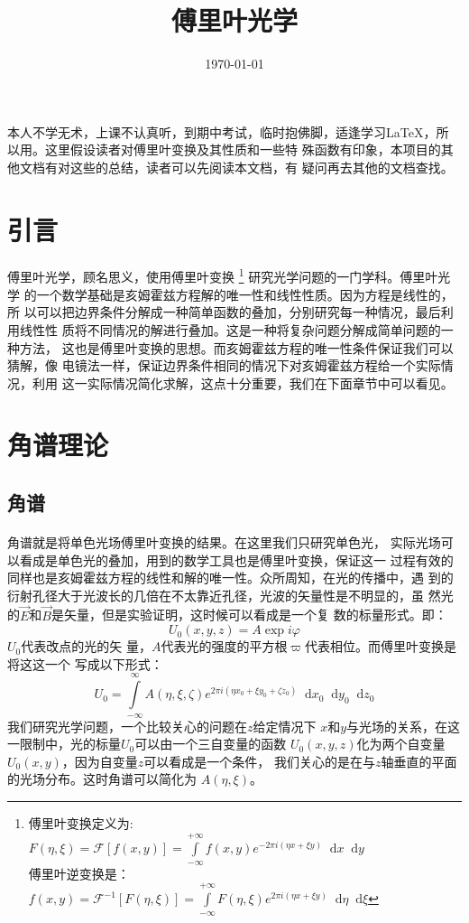 \documentclass{article}
\title{傅里叶光学}
\date{\today}
\newcommand*{\dif}{\mathop{}\!\mathrm{d}}
\begin{document}
\maketitle
\tableofcontents
本人不学无术，上课不认真听，到期中考试，临时抱佛脚，适逢学习\LaTeX，所
以用。这里假设读者对傅里叶变换及其性质和一些特
殊函数有印象，本项目的其他文档有对这些的总结，读者可以先阅读本文档，有
疑问再去其他的文档查找。
\section{引言}
\paragraph{}
傅里叶光学，顾名思义，使用傅里叶变换
\footnote{
  傅里叶变换定义为:$F(\eta,\xi)=\mathscr{F}[f(x,y)]=\int\limits_{-\infty}^{+\infty}f(x,y)e^{-2\pi i(\eta x+\xi y)}\dif x\dif y$\\
  傅里叶逆变换是：
  $f(x,y)=\mathscr{F}^{-1}[F(\eta,\xi)]=\int\limits_{-\infty}^{+\infty}F(\eta,\xi)e^{2\pi
    i(\eta x+\xi y)}\dif \eta\dif\xi$
}
研究光学问题的一门学科。傅里叶光学
的一个数学基础是亥姆霍兹方程解的唯一性和线性性质。因为方程是线性的，所
以可以把边界条件分解成一种简单函数的叠加，分别研究每一种情况，最后利用线性性
质将不同情况的解进行叠加。这是一种将复杂问题分解成简单问题的一种方法，
这也是傅里叶变换的思想。而亥姆霍兹方程的唯一性条件保证我们可以猜解，像
电镜法一样，保证边界条件相同的情况下对亥姆霍兹方程给一个实际情况，利用
这一实际情况简化求解，这点十分重要，我们在下面章节中可以看见。
\section{角谱理论}
\subsection{角谱}
\paragraph{}
角谱就是将单色光场傅里叶变换的结果。在这里我们只研究单色光，
实际光场可以看成是单色光的叠加，用到的数学工具也是傅里叶变换，保证这一
过程有效的同样也是亥姆霍兹方程的线性和解的唯一性。众所周知，在光的传播中，遇
到的衍射孔径大于光波长的几倍在不太靠近孔径，光波的矢量性是不明显的，虽
然光的$\vec{E}$和$\vec{B}$是矢量，但是实验证明，这时候可以看成是一个复
数的标量形式。即：\[U_0(x,y,z)=A\exp{i\varphi}\] $U_0$代表改点的光的矢
量，$A$代表光的强度的平方根$\varpi$代表相位。而傅里叶变换是将这这一个
写成以下形式：
\[U_0=\int\limits_{-\infty}^{\infty}A(\eta,\xi,\zeta)e^{2\pi i(\eta
    x_0+\xi y_0+\zeta z_0)}\dif x_0 \dif
  y_0 \dif z_0\]我们研究光学问题，一个比较关心的问题在$z$给定情况下
$x$和$y$与光场的关系，在这一限制中，光的标量$U_0$可以由一个三自变量的函数
$U_0(x,y,z)$化为两个自变量$U_0(x,y)$，因为自变量$z$可以看成是一个条件，
我们关心的是在与$z$轴垂直的平面的光场分布。这时角谱可以简化为
$A(\eta,\xi)$。
\end{document}
